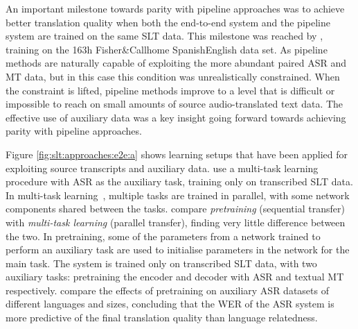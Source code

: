 \documentclass{svjour3}
\newcommand{\lp}[2]{#1#2}
\begin{document}
An important milestone towards parity with pipeline approaches was to achieve better translation quality when both the end-to-end system and the pipeline system are trained on the same SLT data.
This milestone was reached by \citet{weiss-s2s-st-2017},
training on the 163h Fisher\&Callhome \lp{Spanish}{English} data set. As pipeline methods are naturally capable of exploiting the more abundant paired ASR and MT data, but in this case
this condition was unrealistically constrained.
When the constraint is lifted, pipeline methods improve to a level that is difficult or impossible to reach on small amounts of source audio-translated text data.
The effective use of auxiliary data 
was a key insight going forward towards achieving parity with pipeline approaches.

Figure \ref{fig:slt:approaches:e2e:a}
shows learning setups that have been applied for exploiting source transcripts and auxiliary data.
\citet{weiss-s2s-st-2017} use a multi-task learning procedure with ASR as the auxiliary task, training only on transcribed SLT data.
In multi-task learning~\citep{caruana1997multitask}, multiple tasks are trained in parallel, with some network components shared between the tasks.
\citet{berard-e2e-audiobooks-2018} compare \emph{pretraining} (sequential transfer) with \emph{multi-task learning} (parallel transfer),
finding very little difference between the two.
In pretraining, some of the parameters from a network trained to perform an auxiliary task are used to initialise parameters in the network for the main task.
The system is trained only on transcribed SLT data,
with two auxiliary tasks:
pretraining the encoder and decoder with ASR and textual MT respectively.
\citet{stoian2019analyzing} compare the effects of pretraining on auxiliary ASR datasets of different languages and sizes, concluding that the WER of the ASR system is more predictive of the final translation quality than language relatedness.
\end{document}
